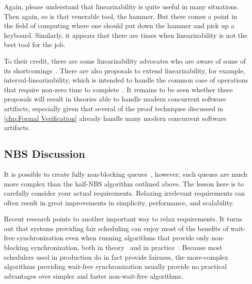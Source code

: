 Again, please understand that linearizability is quite useful in many
situations.
Then again, so is that venerable tool, the hammer.
But there comes a point in the field of computing where one should put
down the hammer and pick up a keyboard.
Similarly, it appears that there are times when linearizability is not
the best tool for the job.

To their credit, there are some linearizability advocates who are aware
of some of its shortcomings~\cite{SergioRajsbaum2020HistoryLinearizability}.
There are also proposals to extend linearizability, for example,
interval-linearizability, which is intended to handle the common case
of operations that require non-zero time to
complete~\cite{10.1145/3266457}.
It remains to be seen whether these proposals will result in theories
able to handle modern concurrent software artifacts, especially given
that several of the proof techniques discussed in \cref{chp:Formal
Verification} already handle many modern concurrent software artifacts.

\subsection{NBS Discussion}
\label{sec:advsync:NBS Discussion}

It is possible to create fully non-blocking queues~\cite{MichaelScott96},
however, such queues are much more complex than the half-NBS algorithm
outlined above.
The lesson here is to carefully consider your actual requirements.
Relaxing irrelevant requirements can often result in great
improvements in simplicity, performance, and scalability.

Recent research points to another important way to relax requirements.
It turns out that systems providing fair scheduling can enjoy most
of the benefits of wait-free synchronization even when running
algorithms that provide only non-blocking
synchronization, both in theory~\cite{DanAlitarh2013PracticalProgress}
and in practice~\cite{SamyAlBahra2013NBS}.
Because most schedulers used in production do in fact provide fairness,
the more-complex algorithms providing wait-free synchronization usually
provide no practical advantages over simpler and faster non-wait-free
algorithms.


